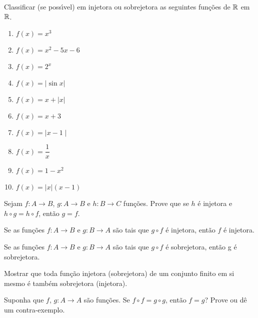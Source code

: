 \documentclass[12pt]{exam}
\begin{document}
    \vspace{.3cm}

    \questao{} Classificar (se poss{\'\i}vel) em injetora ou sobrejetora as seguintes fun{\c c}{\~o}es de $\mathbb{R}$ em $\mathbb{R}$.

    \begin{multicols}{2}
        \begin{enumerate}[label={\alph*})]
            \item $f(x) = x^3$
            \item $f(x) = x^2 - 5x - 6$
            \item $f(x) = 2^x$
            \item $f(x) = | \sin x |$
            \item $f(x) = x + | x |$
            \item $f(x) = x + 3$
            \item $f(x) = \mid x - 1\mid$
            \item $f(x) = \dfrac{1}{x}$
            \item $f(x) = 1 - x^2$
            \item $f(x) = |x|(x - 1)$
        \end{enumerate}
    \end{multicols}

    \vspace{.3cm}

    \questao{} Sejam $f : A \to B$, $g : A \to B$ e $h : B \to C$ fun\c{c}\~oes. Prove que se $h$ \'e injetora e $h \circ g = h \circ f$, ent\~ao $g = f$.

    \vspace{.3cm}

    \questao{} Se as fun{\c c}{\~o}es $f : A \to B$ e $g : B\to A$ s{\~a}o
    tais que $g\circ f$ {\'e} injetora, ent{\~a}o $f$ {\'e} injetora.

    \vspace{.3cm}

    \questao{} Se as fun{\c c}{\~o}es $f : A \to B$ e $g : B\to A$ s{\~a}o
    tais que $g\circ f$ {\'e} sobrejetora, ent{\~a}o g {\'e} sobrejetora.

    \vspace{.3cm}

    \questao{} Mostrar que toda fun{\c c}{\~a}o injetora (sobrejetora) de um conjunto finito em si mesmo {\'e} tamb{\'e}m sobrejetora (injetora).

    \vspace{.3cm}

    \questao{} Suponha que $f$, $g : A \to A$ são funções. Se $f \circ f = g \circ g$, então $f = g$? Prove ou dê um contra-exemplo.
\end{document}
